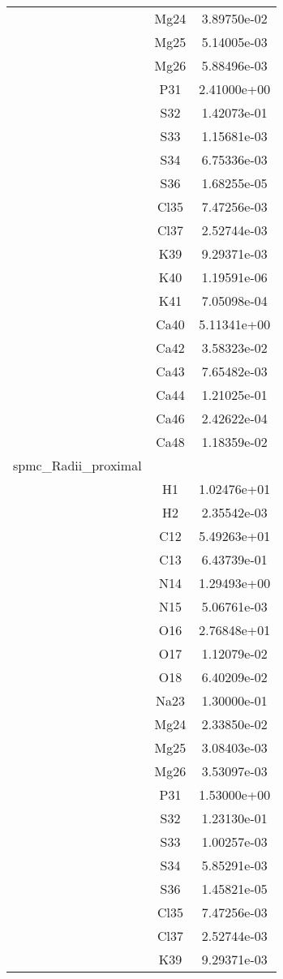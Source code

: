 \begin{centering}
\begin{longtable}{l c c}
& Mg24 & 3.89750e-02 \\ 
& Mg25 & 5.14005e-03 \\ 
& Mg26 & 5.88496e-03 \\ 
& P31 & 2.41000e+00 \\ 
& S32 & 1.42073e-01 \\ 
& S33 & 1.15681e-03 \\ 
& S34 & 6.75336e-03 \\ 
& S36 & 1.68255e-05 \\ 
& Cl35 & 7.47256e-03 \\ 
& Cl37 & 2.52744e-03 \\ 
& K39 & 9.29371e-03 \\ 
& K40 & 1.19591e-06 \\ 
& K41 & 7.05098e-04 \\ 
& Ca40 & 5.11341e+00 \\ 
& Ca42 & 3.58323e-02 \\ 
& Ca43 & 7.65482e-03 \\ 
& Ca44 & 1.21025e-01 \\ 
& Ca46 & 2.42622e-04 \\ 
& Ca48 & 1.18359e-02 \\ 
\hline
spmc\_Radii\_proximal & & \\
\hline
& H1 & 1.02476e+01 \\ 
& H2 & 2.35542e-03 \\ 
& C12 & 5.49263e+01 \\ 
& C13 & 6.43739e-01 \\ 
& N14 & 1.29493e+00 \\ 
& N15 & 5.06761e-03 \\ 
& O16 & 2.76848e+01 \\ 
& O17 & 1.12079e-02 \\ 
& O18 & 6.40209e-02 \\ 
& Na23 & 1.30000e-01 \\ 
& Mg24 & 2.33850e-02 \\ 
& Mg25 & 3.08403e-03 \\ 
& Mg26 & 3.53097e-03 \\ 
& P31 & 1.53000e+00 \\ 
& S32 & 1.23130e-01 \\ 
& S33 & 1.00257e-03 \\ 
& S34 & 5.85291e-03 \\ 
& S36 & 1.45821e-05 \\ 
& Cl35 & 7.47256e-03 \\ 
& Cl37 & 2.52744e-03 \\ 
& K39 & 9.29371e-03 \\ 

\end{longtable}
\end{centering}
